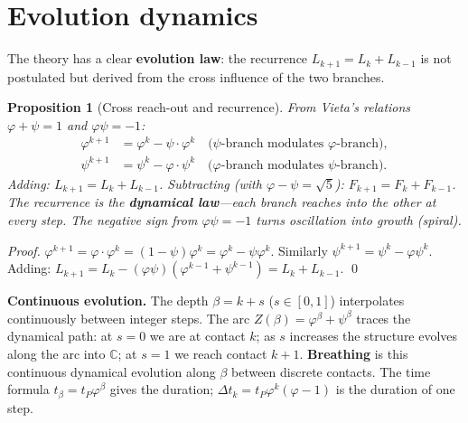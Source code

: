 \documentclass[12pt,a4paper]{article}
\newtheorem{proposition}[theorem]{Proposition}
\begin{document}
\section{Evolution dynamics}
\label{sec:dynamics}

The theory has a clear \textbf{evolution law}: the recurrence $L_{k+1} = L_k + L_{k-1}$ is not postulated but derived from the cross influence of the two branches.

\begin{proposition}[Cross reach-out and recurrence]
\label{prop:cross-reach-out}
From Vieta's relations $\varphi + \psi = 1$ and $\varphi\psi = -1$:
\begin{align}
\varphi^{k+1} &= \varphi^k - \psi\cdot\varphi^k \quad \text{($\psi$-branch modulates $\varphi$-branch)}, \\
\psi^{k+1} &= \psi^k - \varphi\cdot\psi^k \quad \text{($\varphi$-branch modulates $\psi$-branch)}.
\end{align}
Adding: $L_{k+1} = L_k + L_{k-1}$. Subtracting (with $\varphi - \psi = \sqrt{5}$): $F_{k+1} = F_k + F_{k-1}$. The recurrence is the \textbf{dynamical law}---each branch reaches into the other at every step. The negative sign from $\varphi\psi = -1$ turns oscillation into growth (spiral).
\end{proposition}

\begin{proof}
$\varphi^{k+1} = \varphi \cdot \varphi^k = (1-\psi)\varphi^k = \varphi^k - \psi\varphi^k$. Similarly $\psi^{k+1} = \psi^k - \varphi\psi^k$. Adding: $L_{k+1} = L_k - (\varphi\psi)(\varphi^{k-1}+\psi^{k-1}) = L_k + L_{k-1}$. \qed
\end{proof}

\noindent\textbf{Continuous evolution.} The depth $\beta = k + s$ ($s \in [0,1]$) interpolates continuously between integer steps. The arc $Z(\beta) = \varphi^\beta + \psi^\beta$ traces the dynamical path: at $s=0$ we are at contact $k$; as $s$ increases the structure evolves along the arc into $\mathbb{C}$; at $s=1$ we reach contact $k+1$. \textbf{Breathing} is this continuous dynamical evolution along $\beta$ between discrete contacts. The time formula $t_\beta = t_P\varphi^\beta$ gives the duration; $\Delta t_k = t_P\varphi^k(\varphi-1)$ is the duration of one step.

\end{document}
